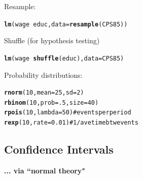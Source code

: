 \documentclass{report}\usepackage{graphicx, color}
\makeatletter
\newcommand{\hlfunctioncall}[1]{\textcolor[rgb]{0.501960784313725,0,0.329411764705882}{\textbf{#1}}}%
\newcommand{\hlcomment}[1]{\textcolor[rgb]{0.180392156862745,0.6,0.341176470588235}{#1}}%
\newenvironment{kframe}{%
 \def\at@end@of@kframe{}%
 \ifinner\ifhmode%
  \def\at@end@of@kframe{\end{minipage}}%
  \begin{minipage}{\columnwidth}%
 \fi\fi%
 \def\FrameCommand##1{\hskip\@totalleftmargin \hskip-\fboxsep
 \colorbox{shadecolor}{##1}\hskip-\fboxsep
     \hskip-\linewidth \hskip-\@totalleftmargin \hskip\columnwidth}%
 \MakeFramed {\advance\hsize-\width
   \@totalleftmargin\z@ \linewidth\hsize
   \@setminipage}}%
 {\par\unskip\endMakeFramed%
 \at@end@of@kframe}
\newenvironment{knitrout}{}{} %
\makeatother
\begin{document}
\begin{multicols}{4}
Resample:

\vspace*{-.1in}

\begin{knitrout}
\color{fgcolor}\begin{kframe}
\begin{alltt}
\hlfunctioncall{lm}(wage~educ,data=\hlfunctioncall{resample}(CPS85))
\end{alltt}
\end{kframe}
\end{knitrout}


\vspace*{-.1in}

Shuffle (for hypothesis testing)

\vspace*{-.1in}

\begin{knitrout}
\color{fgcolor}\begin{kframe}
\begin{alltt}
\hlfunctioncall{lm}(wage~\hlfunctioncall{shuffle}(educ),data=CPS85)
\end{alltt}
\end{kframe}
\end{knitrout}


Probability distributions:

\vspace*{-.1in}

\begin{knitrout}
\color{fgcolor}\begin{kframe}
\begin{alltt}
\hlfunctioncall{rnorm}(10,mean=25,sd=2)
\hlfunctioncall{rbinom}(10,prob=.5,size=40)
\hlfunctioncall{rpois}(10,lambda=50) \hlcomment{# events per period}
\hlfunctioncall{rexp}(10,rate=0.01) \hlcomment{# 1/ave time btw events}
\end{alltt}
\end{kframe}
\end{knitrout}

\vspace*{-.1in}

\subsection*{Confidence Intervals}
 {\bf ... via ``normal theory"}


\end{multicols}
\end{document}
